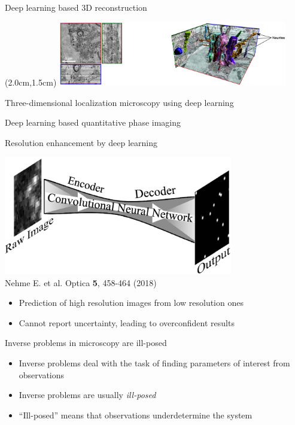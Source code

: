 \documentclass{beamer}					%
\begin{document}
\begin{frame}{Deep learning based 3D reconstruction}
\begin{textblock*}{10cm}(2.0cm,1.5cm)
\includegraphics[width=10cm]{../../postdoc/sartorius/media/UNET-2.png}
\end{textblock*}
\end{frame}

\begin{frame}{Three-dimensional localization microscopy using deep learning}

\end{frame}

\begin{frame}{Deep learning based quantitative phase imaging}

\end{frame}

\begin{frame}{Resolution enhancement by deep learning}
\begin{center}
\includegraphics[width=10cm]{../../postdoc/sartorius/media/Deep-STORM.jpeg}
\\Nehme E. et al. Optica \textbf{5}, 458-464 (2018)
\vspace{0.5cm}
\begin{itemize}
\item Prediction of high resolution images from low resolution ones
\item Cannot report uncertainty, leading to overconfident results
\end{itemize}
\end{center}
\end{frame}

\begin{frame}{Inverse problems in microscopy are ill-posed}

\begin{itemize}
\item Inverse problems deal with the task of finding parameters of interest from observations
\item Inverse problems are usually \emph{ill-posed}
\item ``Ill-posed'' means that observations underdetermine the system
\end{itemize}



\end{frame}
\end{document}
